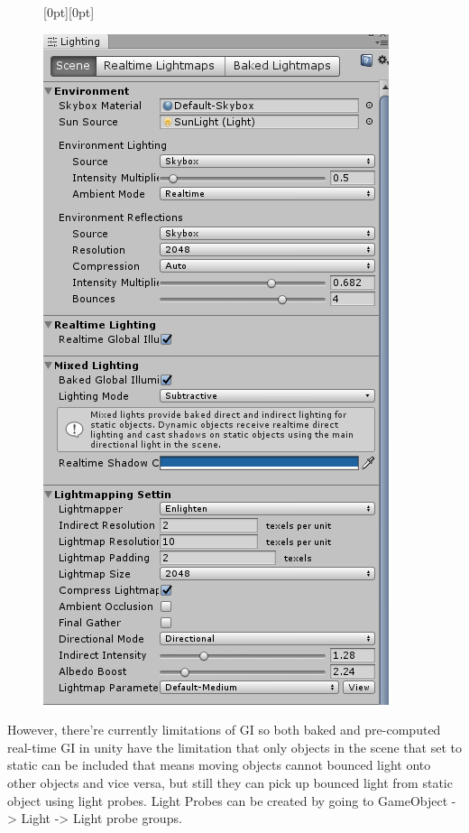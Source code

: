 \documentclass[a4paper, 13pt]{extarticle}
\begin{document}
{ \newpage
 \begin{figure}[h]
 	\raisebox{-50mm}[0pt][0pt]{
 	\begin{minipage}{1\textwidth}
 		\centering
 		\includegraphics[width=0.3\linewidth]{intructions/lighting_setting.png}
 		\centering
 	\end{minipage}
}
 \end{figure}
\vspace{100mm}
 However, there're currently limitations of GI so both baked and pre-computed real-time GI in unity have the limitation that only objects in the scene that set to static can be included that means moving objects cannot bounced light onto other objects and vice versa, but still they can pick up bounced light from static object using light probes. Light Probes can be created by going to GameObject -> Light -> Light probe groups.
 
}
\end{document}
